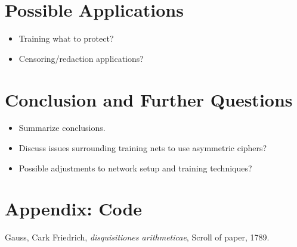 \documentclass[11pt, conference]{IEEEtran}
\begin{document}
\section{Possible Applications} 
\begin{itemize}
    \item Training what to protect?
    \item Censoring/redaction applications?
\end{itemize}
\section{Conclusion and Further Questions}
\begin{itemize}
    \item Summarize conclusions.
    \item Discuss issues surrounding training nets to use asymmetric ciphers?
    \item Possible adjustments to network setup and training techniques?
\end{itemize}
\section{Appendix: Code}

\begin{thebibliography}{9}
Gauss, Cark Friedrich, \textit{disquisitiones arithmeticae}, Scroll of paper, 1789.


\end{thebibliography}
\end{document}
